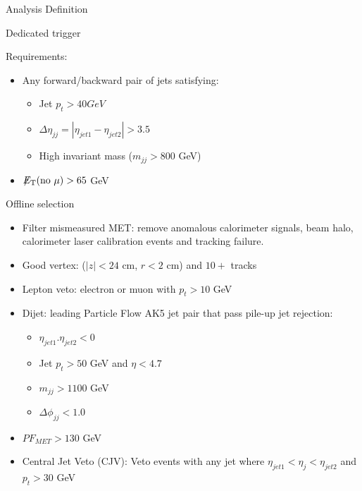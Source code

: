 \documentclass[8pt]{beamer}
\newcommand{\met}{\displaystyle{\not} E_{\rm T}}
\begin{document}
\begin{frame}{Analysis Definition}
 
\begin{block}{Dedicated trigger}
 
Requirements:
\begin{itemize}
 \item Any forward/backward pair of jets satisfying:
 \begin{itemize}
  \item Jet $p_t>40 GeV$
  \item $\Delta\eta_{jj} = | \eta_{jet1} - \eta_{jet2}| > 3.5$
  \item High invariant mass ($m_{jj}>800$ GeV)
 \end{itemize}
 \item $\met(\text{no }\mu)>65$ GeV
\end{itemize}
 
\end{block}

\begin{block}{Offline selection}
 
\begin{itemize}
 \item Filter mismeasured MET: remove anomalous calorimeter signals, beam halo, calorimeter laser calibration events and tracking failure. 
 \item Good vertex: ($|z|<24$ cm, $r<2$ cm) and $10+$ tracks
 \item Lepton veto: electron or muon with $p_t>10$ GeV
 
 \item Dijet: leading Particle Flow AK5 jet pair that pass pile-up jet rejection:
 \begin{itemize}
  \item $\eta_{jet1} . \eta_{jet2} < 0$
  \item Jet $p_t > 50$ GeV and $\eta < 4.7$
  \item $m_{jj}>1100$ GeV
  \item $\Delta\phi_{jj} < 1.0$
 \end{itemize}

 \item $PF_{MET} > 130$ GeV
 
 \item Central Jet Veto (CJV): Veto events with any jet where $\eta_{jet1} < \eta_{j} < \eta_{jet2}$ and $p_t>30$ GeV
 
\end{itemize}
 
 
\end{block}
 
\end{frame}
\end{document}
